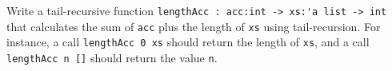 Write a tail-recursive function \lstinline{lengthAcc : acc:int -> xs:'a list -> int} that calculates the sum of \lstinline{acc} plus the length of \lstinline{xs} using tail-recursion. For instance, a call \lstinline{lengthAcc 0 xs} should return the length of \lstinline{xs}, and a call \lstinline{lengthAcc n []} should return the value \lstinline{n}.
